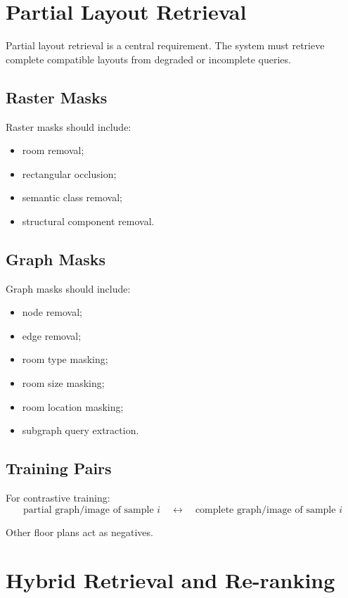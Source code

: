\documentclass[11pt,a4paper]{article}
\begin{document}
\section{Partial Layout Retrieval}

Partial layout retrieval is a central requirement. The system must retrieve complete compatible layouts from degraded or incomplete queries.

\subsection{Raster Masks}

Raster masks should include:
\begin{itemize}
    \item room removal;
    \item rectangular occlusion;
    \item semantic class removal;
    \item structural component removal.
\end{itemize}

\subsection{Graph Masks}

Graph masks should include:
\begin{itemize}
    \item node removal;
    \item edge removal;
    \item room type masking;
    \item room size masking;
    \item room location masking;
    \item subgraph query extraction.
\end{itemize}

\subsection{Training Pairs}

For contrastive training:
\[
\text{partial graph/image of sample } i \quad \leftrightarrow \quad \text{complete graph/image of sample } i
\]

Other floor plans act as negatives.

\section{Hybrid Retrieval and Re-ranking}
\end{document}
